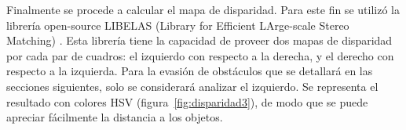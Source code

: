 \documentclass[journal]{IEEEtran}
\begin{document}
Finalmente se procede a calcular el mapa de disparidad. Para este fin se utiliz\'o la librer\'ia open-source LIBELAS (Library for Efficient LArge-scale Stereo Matching) \cite{G10}. Esta librer\'ia tiene la capacidad de proveer dos mapas de disparidad por cada par de cuadros: el izquierdo con respecto a la derecha, y el derecho con respecto a la izquierda. Para la evasi\'on de obst\'aculos que se detallar\'a en las secciones siguientes, solo se considerar\'a analizar el izquierdo. Se representa el resultado con colores HSV (figura~\ref{fig:disparidad3}), de modo que se puede apreciar f\'acilmente la distancia a los objetos.

\begin{figure}[ht]
\centering
{}




\end{figure}
\end{document}
